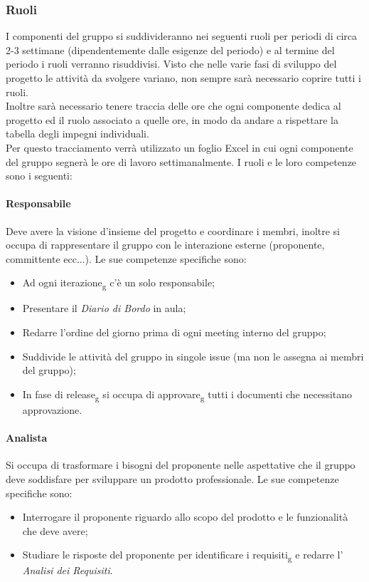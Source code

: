 \subsubsection{Ruoli}
I componenti del gruppo si suddivideranno nei seguenti ruoli per periodi di circa 2-3 settimane (dipendentemente dalle esigenze del periodo) e al termine del periodo i ruoli verranno risuddivisi. 
Visto che nelle varie fasi di sviluppo del progetto le attività da svolgere variano, non sempre sarà necessario coprire tutti i ruoli.\\
Inoltre sarà necessario tenere traccia delle ore che ogni componente dedica al progetto ed il ruolo associato a quelle ore, in modo da andare a rispettare la tabella degli impegni individuali.\\
Per questo tracciamento verrà utilizzato un foglio Excel in cui ogni componente del gruppo segnerà le ore di lavoro settimanalmente.
I ruoli e le loro competenze sono i seguenti:

\paragraph{Responsabile}
Deve avere la visione d'insieme del progetto e coordinare i membri, inoltre si occupa di rappresentare il gruppo con le interazione esterne (proponente, committente ecc...). Le sue competenze specifiche sono:
\begin{itemize}
	\item Ad ogni iterazione\textsubscript{g} c'è un solo responsabile;
	\item Presentare il \textit{Diario di Bordo} in aula;
	\item Redarre l'ordine del giorno prima di ogni meeting interno del gruppo;
	\item Suddivide le attività del gruppo in singole issue (ma non le assegna ai membri del gruppo);
	\item In fase di release\textsubscript{g} si occupa di approvare\textsubscript{g} tutti i documenti che necessitano approvazione.
\end{itemize}

\paragraph{Analista}
Si occupa di trasformare i bisogni del proponente nelle aspettative che il gruppo deve soddisfare per sviluppare un prodotto professionale. Le sue competenze specifiche sono:
\begin{itemize}
	\item Interrogare il proponente riguardo allo scopo del prodotto e le funzionalità che deve avere;
	\item Studiare le risposte del proponente per identificare i requisiti\textsubscript{g} e redarre l' \textit{Analisi dei Requisiti}.
\end{itemize}

